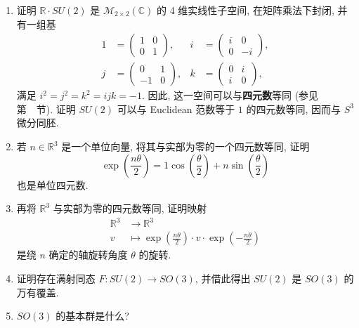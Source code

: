 \begin{RiemannExercise}
\begin{enumerate}[label=(\arabic*),ref=\arabic*,leftmargin=*]
\begin{enumerate}[label=(\alph*),leftmargin=*]
\item 证明 $\mathbb{R}\cdot SU(2)$ 是 $\mathcal M_{2\times 2}(\mathbb{C})$ 的 4 维实线性子空间, 在矩阵乘法下封闭, 并有一组基
\begin{align*}
  1&=\begin{pmatrix}1&0\\0&1\end{pmatrix},&
  i&=\begin{pmatrix}i&0\\0&-i\end{pmatrix},\\
  j&=\begin{pmatrix}0&1\\-1&0\end{pmatrix},&
  k&=\begin{pmatrix}0&i\\i&0\end{pmatrix},
\end{align*}
满足 $i^2=j^2=k^2=ijk=-1$. 因此, 这一空间可以与\textbf{四元数}等同 (参见第~~节). 证明 $SU(2)$ 可以与 Euclidean 范数等于 $1$ 的四元数等同, 因而与 $S^3$ 微分同胚.
\item 若 $n\in\mathbb{R}^3$ 是一个单位向量, 将其与实部为零的一个四元数等同, 证明
\[
  \exp\left(\frac{n\theta}{2}\right)
    =1\cos\left(\frac{\theta}{2}\right)+n\sin\left(\frac{\theta}{2}\right)
\]
也是单位四元数.
\item 再将 $\mathbb{R}^3$ 与实部为零的四元数等同, 证明映射
\begin{align*}
  \mathbb{R}^3&\to\mathbb{R}^3\\
  v&\mapsto\exp\left(\frac{n\theta}{2}\right)\cdot v\cdot
       \exp\left(-\frac{n\theta}{2}\right)
\end{align*}
是绕 $n$ 确定的轴旋转角度 $\theta$ 的旋转.
\item 证明存在满射同态 $F:SU(2)\to SO(3)$, 并借此得出 $SU(2)$ 是 $SO(3)$ 的万有覆盖.
\item $SO(3)$ 的基本群是什么?
\end{enumerate}
\end{enumerate}
\end{RiemannExercise}
